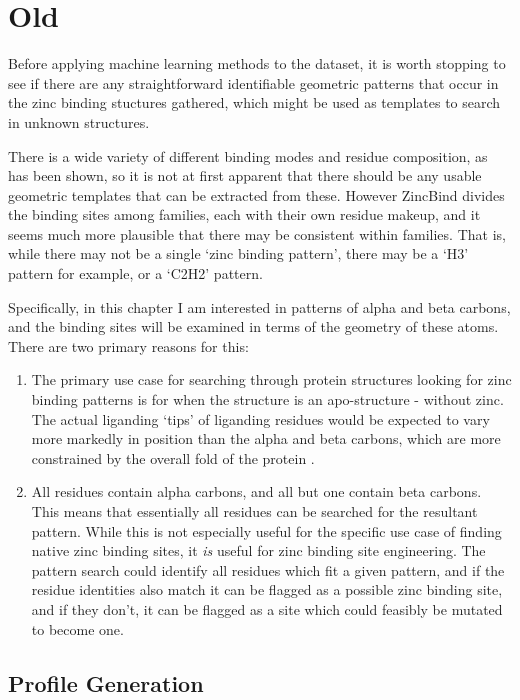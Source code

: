 \section{Old}


Before applying machine learning methods to the dataset, it is worth stopping to see if there are any straightforward identifiable geometric patterns that occur in the zinc binding stuctures gathered, which might be used as templates to search in unknown structures.

There is a wide variety of different binding modes and residue composition, as has been shown, so it is not at first apparent that there should be any usable geometric templates that can be extracted from these. However ZincBind divides the binding sites among families, each with their own residue makeup, and it seems much more plausible that there may be consistent within families. That is, while there may not be a single `zinc binding pattern', there may be a `H3' pattern for example, or a `C2H2' pattern.

Specifically, in this chapter I am interested in patterns of alpha and beta carbons, and the binding sites will be examined in terms of the geometry of these atoms. There are two primary reasons for this:

\begin{enumerate}
   \item The primary use case for searching through protein structures looking for zinc binding patterns is for when the structure is an apo-structure - without zinc. The actual liganding `tips' of liganding residues would be expected to vary more markedly in position than the alpha and beta carbons, which are more constrained by the overall fold of the protein .
   \item All residues contain alpha carbons, and all but one contain beta carbons. This means that essentially all residues can be searched for the resultant pattern. While this is not especially useful for the specific use case of finding native zinc binding sites, it \emph{is} useful for zinc binding site engineering. The pattern search could identify all residues which fit a given pattern, and if the residue identities also match it can be flagged as a possible zinc binding site, and if they don't, it can be flagged as a site which could feasibly be mutated to become one.
\end{enumerate}

\subsection{Profile Generation}

